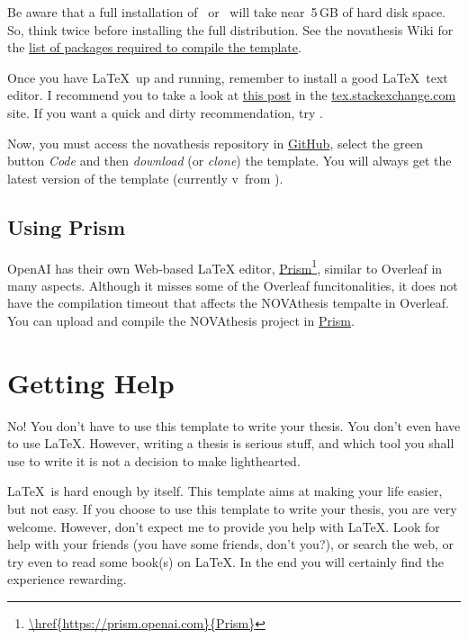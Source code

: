 Be aware that a full installation of \MikTeX\ or \TeXLive\ will take near~5\,GB of hard disk space.  So, think twice before installing the full distribution.  See the \gls{novathesis} Wiki for the \href{https://github.com/joaomlourenco/novathesis/wiki/installing-latex#minimal-installation-in-any-of-the-systems-above}{list of packages required to compile the template}.

Once you have \LaTeX\ up and running, remember to install a good \LaTeX\ text editor.  I recommend you to take a look at  \href{https://tex.stackexchange.com/questions/339/latex-editors-ides}{this post} in the \url{tex.stackexchange.com} site.  If you want a quick and dirty recommendation, try \href{https://www.texstudio.org/}{}.

Now, you must access the \gls{novathesis} repository in \href{https://github.com/joaomlourenco/novathesis}{GitHub}, select the green button \emph{Code} and then \emph{download} (or \emph{clone}) the template.  You will always get the latest version of the template (currently v\novathesisversion\ from \novathesisdate).


\subsection{Using Prism}
\label{sub:using_prism}

OpenAI has their own Web-based LaTeX editor, \href{https://prism.openai.com}{Prism}\footnote{\url{\href{https://prism.openai.com}{Prism}}}, similar to Overleaf in many aspects.  Although it misses some of the Overleaf funcitonalities, it does not have the compilation timeout that affects the NOVAthesis tempalte in Overleaf.  You can upload and compile the NOVAthesis project in \href{https://prism.openai.com}{Prism}.


\section{Getting Help}
\label{sec:getting_help}

\ntindex[Help]{}

No! You don't have to use this template to write your thesis.  You don't even have to use \LaTeX.  However, writing a thesis is serious stuff, and which tool you shall use to write it is not a decision to make lighthearted.

\LaTeX\ is hard enough by itself.  This template aims at making your life easier, but not easy. If you choose to use this template to write your thesis, you are very welcome.  However, don't expect me to provide you help with \LaTeX.  Look for help with your friends (you have some friends, don't you?), or search the web, or try even to read some book(s) on \LaTeX. In the end you will certainly find the experience rewarding.

